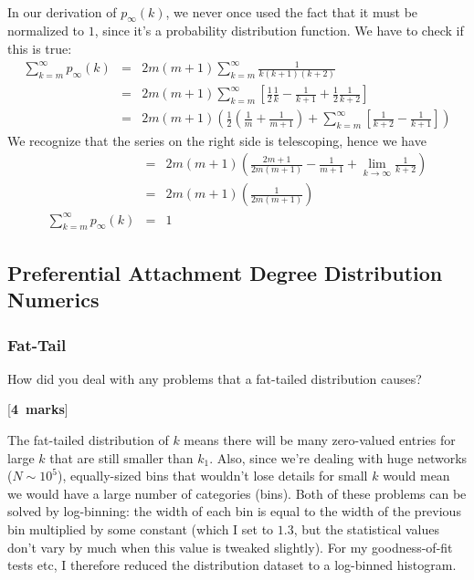\documentclass[a4paper,12pt]{article}
\newcounter{nmarks}
\newcommand{\qmarks}[1]{\addtocounter{nmarks}{#1} }
\renewcommand{\qmarks}[1]{\addtocounter{nmarks}{#1} \hspace*{\fill} [\textbf{#1~marks}]}
\begin{document}
\hfill\\
In our derivation of $p_\infty(k)$, we never once used the fact that it must be normalized to $1$, since it's a probability distribution function. We have to check if this is true:
\begin{eqnarray*}
\sum_{k=m}^\infty p_\infty(k) &=& 2m(m+1)\sum_{k=m}^\infty \frac{1}{k(k+1)(k+2)}\\
&=& 2m(m+1)\sum_{k=m}^\infty \left[ \frac{1}{2}\frac{1}{k} - \frac{1}{k+1} + \frac{1}{2} \frac{1}{k+2} \right]\\
&=& 2m(m+1)\left( \frac{1}{2}\left(\frac{1}{m}+\frac{1}{m+1}\right) + \sum_{k=m}^\infty \left[\frac{1}{k+2}-\frac{1}{k+1} \right] \right)
\end{eqnarray*}
We recognize that the series on the right side is telescoping, hence we have
\begin{eqnarray*}
&=&2m(m+1)\left( \frac{2m+1}{2m(m+1)} - \frac{1}{m+1} + \lim_{k\to\infty} \frac{1}{k+2} \right)\\
&=&2m(m+1)\left( \frac{1}{2m(m+1)} \right)\\
\sum_{k=m}^\infty p_\infty(k) &=&  1
\end{eqnarray*}


\subsection{Preferential Attachment Degree Distribution Numerics}

\subsubsection{Fat-Tail}
How did you deal with any problems that a fat-tailed distribution causes? \qmarks{4}

The fat-tailed distribution of $k$ means there will be many zero-valued entries for large $k$ that are still smaller than $k_1$. Also, since we're dealing with huge networks ($N\sim 10^5$), equally-sized bins that wouldn't lose details for small $k$ would mean we would have a large number of categories (bins). Both of these problems can be solved by log-binning: the width of each bin is equal to the width of the previous bin multiplied by some constant (which I set to $1.3$, but the statistical values don't vary by much when this value is tweaked slightly). For my goodness-of-fit tests etc, I therefore reduced the distribution dataset to a log-binned histogram.
\end{document}
